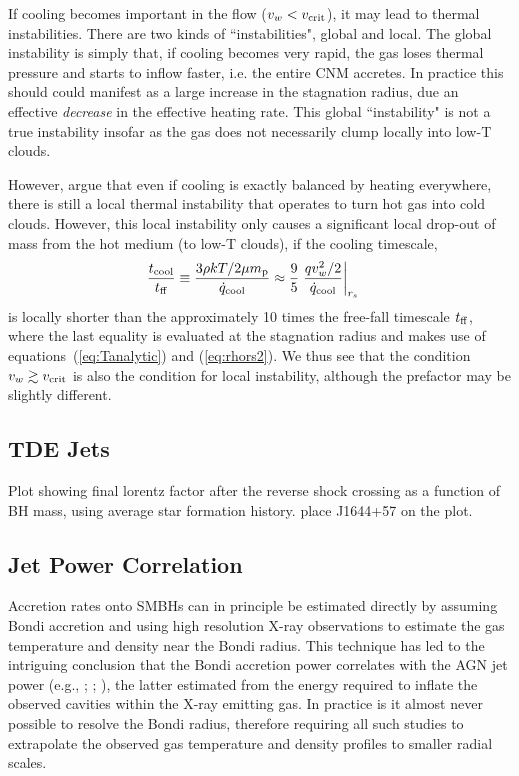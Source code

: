 \documentclass[usenatbib,fleqn]{mn2e}
\newcommand{\rs}{r_s}
\newcommand{\vw}{v_w}
\renewcommand{\mp}{m_{\rm p}}
\newcommand{\tcool}{t_{\rm cool}}
\newcommand{\tff}{t_{\rm ff}}
\begin{document}
If cooling becomes important in the flow ($v_{w} < v_{\rm crit}$), it may lead to thermal instabilities.  There are two kinds of ``instabilities", global and local.  The global instability is simply that, if cooling becomes very rapid, the gas loses thermal pressure and starts to inflow faster, i.e. the entire CNM accretes.  In
practice this should could manifest as a large increase in the stagnation radius, due an effective {\it decrease} in the effective heating rate.  This global ``instability" is not a true instability insofar as the gas does not necessarily clump locally into low-T clouds.

However, \citet{McCourt+12} argue that even if cooling is exactly
balanced by heating everywhere, there is still a local thermal
instability that operates to turn hot gas into cold clouds.  However,
this local instability only causes a significant local drop-out of
mass from the hot medium (to low-T clouds), if the cooling timescale,
\begin{align}
\frac{\tcool}{\tff} &\equiv \frac{3\rho k T/2 \mu \mp}{\dot{q}_{\rm cool}} \approx \frac{9}{5} \left. \frac{q \vw^2/2}{\dot{q}_{\rm cool}}\right|_{\rs}
\end{align} 
is locally shorter than the approximately 10 times the free-fall
timescale $t_{\rm ff}$, where the last equality is evaluated at the
stagnation radius and makes use of equations~(\ref{eq:Tanalytic}) and
(\ref{eq:rhors2}).  We thus see that the condition $v_w \gtrsim v_{\rm
  crit}$ is also the condition for local instability, although the
prefactor may be slightly different.

\subsection{TDE Jets}

Plot showing final lorentz factor after the reverse shock crossing as a function of BH mass, using average star formation history.  place J1644+57 on the plot.

\subsection{Jet Power Correlation}


Accretion rates onto SMBHs can in principle be estimated directly by assuming Bondi accretion and using high resolution X-ray observations to estimate the gas temperature and density near the Bondi radius.  This technique has led to the intriguing conclusion that the Bondi accretion power correlates with the AGN jet power (e.g.,
\citealt{AllenDunn+:2006a}; \citealt{Russell+13};
\citealt{FujitaKawakatu+:2014a}), the latter estimated from the energy
required to inflate the observed cavities within the X-ray emitting
gas.  In practice is it almost never possible to resolve the Bondi radius, therefore requiring all such studies to extrapolate the observed gas temperature and density profiles to smaller radial scales.  
\end{document}
